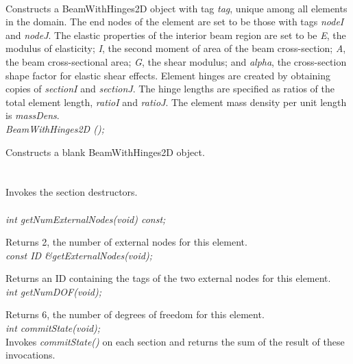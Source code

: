   \\
Constructs a BeamWithHinges2D object with tag {\em tag}, unique among all elements
in the domain.  The end nodes of the element are set to be those with tags 
{\em nodeI} and {\em nodeJ}.  The elastic properties of the interior beam region
are set to be {\em E}, the modulus of elasticity; {\em I}, the second moment of
area of the beam cross-section; {\em A}, the beam cross-sectional area; {\em G},
the shear modulus; and {\em alpha}, the cross-section shape factor for elastic shear 
effects.  Element hinges are created by obtaining copies of {\em sectionI} and {\em sectionJ}.
The hinge lengths are specified as ratios of the total element length, {\em ratioI}
and {\em ratioJ}.  The element mass density per unit length is {\em massDens}. \\

{\em BeamWithHinges2D ();} 

Constructs a blank BeamWithHinges2D object. \\

 \\
\\ 
Invokes the section destructors. \\

  \\
{\em int getNumExternalNodes(void) const;} 

Returns 2, the number of external nodes for this element. \\

{\em const ID \&getExternalNodes(void);} 

Returns an ID containing the tags of the two external nodes for this element. \\

{\em int getNumDOF(void);}

Returns 6, the number of degrees of freedom for this element. \\ 

{\em int commitState(void);} \\
Invokes {\em commitState()} on each section and returns the sum of the result of
these invocations. \\

